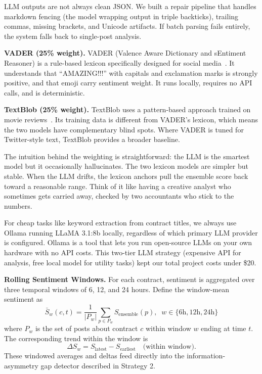 \documentclass[conference]{IEEEtran}
\begin{document}
LLM outputs are not always clean JSON. We built a repair pipeline that handles markdown fencing (the model wrapping output in triple backticks), trailing commas, missing brackets, and Unicode artifacts. If batch parsing fails entirely, the system falls back to single-post analysis.

\textbf{VADER (25\% weight).} VADER (Valence Aware Dictionary and sEntiment Reasoner) is a rule-based lexicon specifically designed for social media~\cite{hutto2014}. It understands that ``AMAZING!!!'' with capitals and exclamation marks is strongly positive, and that emoji carry sentiment weight. It runs locally, requires no API calls, and is deterministic.

\textbf{TextBlob (25\% weight).} TextBlob uses a pattern-based approach trained on movie reviews~\cite{loria2020}. Its training data is different from VADER's lexicon, which means the two models have complementary blind spots. Where VADER is tuned for Twitter-style text, TextBlob provides a broader baseline.

The intuition behind the weighting is straightforward: the LLM is the smartest model but it occasionally hallucinates. The two lexicon models are simpler but stable. When the LLM drifts, the lexicon anchors pull the ensemble score back toward a reasonable range. Think of it like having a creative analyst who sometimes gets carried away, checked by two accountants who stick to the numbers.

For cheap tasks like keyword extraction from contract titles, we always use Ollama running LLaMA 3.1:8b locally, regardless of which primary LLM provider is configured. Ollama is a tool that lets you run open-source LLMs on your own hardware with no API costs. This two-tier LLM strategy (expensive API for analysis, free local model for utility tasks) kept our total project costs under \$20.

\textbf{Rolling Sentiment Windows.} For each contract, sentiment is aggregated over three temporal windows of 6, 12, and 24 hours. Define the window-mean sentiment as
\begin{equation}
\bar{S}_{w}(c, t) = \frac{1}{|P_{w}|} \sum_{p \in P_{w}} S_{\text{ensemble}}(p), \;\; w \in \{6\text{h}, 12\text{h}, 24\text{h}\}
\end{equation}
where $P_{w}$ is the set of posts about contract $c$ within window $w$ ending at time $t$. The corresponding trend within the window is
\begin{equation}
\Delta S_{w} = S_{\text{latest}} - S_{\text{earliest}} \quad \text{(within window)}.
\end{equation}
These windowed averages and deltas feed directly into the information-asymmetry gap detector described in Strategy 2.
\end{document}

